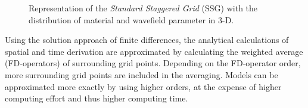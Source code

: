\documentclass[pdftex,a4paper,parskip,listof=totoc,bibliography=totoc,onehalfspacing,12pt]{scrreprt}
\begin{document}
\begin{figure}
\caption[Representation of the \textit{Standard Staggered Grid} (SSG).]{Representation of the \textit{Standard Staggered Grid} (SSG) with the distribution of material and wavefield parameter in 3-D.}
\label{fig:StagGrid}
\end{figure}

Using the solution approach of finite differences, the analytical calculations of spatial and time derivation are approximated by calculating the weighted average (FD-operators) of surrounding grid points. Depending on the FD-operator order, more surrounding grid points are included in the averaging. Models can be approximated more exactly by using higher orders, at the expense of higher computing effort and thus higher computing time.
\end{document}

